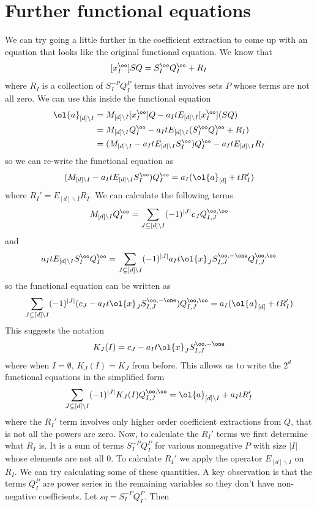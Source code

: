 \section{Further functional equations}
We can try going a little further in the coefficient extraction to come up with an equation that looks like the original functional equation. We know that
\[
	[x_I^\oo] SQ  = S_I^\oo Q_I^\oo + R_I
\]
where $R_I$ is a collection of $S_I^{-P} Q_I^{P}$ terms that involves sets $P$ whose terms are not all zero. We can use this inside the functional equation
\begin{align*}
	\ol{a}_{[d]\backslash I} &= M_{[d]\backslash I}[x_I^\oo]Q- a_{I}t E_{[d]\backslash I}[x_I^\oo](SQ)\\
	& = M_{[d]\backslash I}Q_I^\oo- a_{I}t E_{[d]\backslash I}(S_I^\oo Q_I^\oo + R_I)\\
	& = (M_{[d]\backslash I} - a_{I}t E_{[d]\backslash I}S_I^\oo)Q_I^\oo  -a_{I}t E_{[d]\backslash I}R_I
\end{align*}
so we can re-write the functional equation as
\[
	(M_{[d]\backslash I} - a_{I}t E_{[d]\backslash I}S_I^\oo)Q_I^\oo = a_I(\ol{a}_{[d]}+t R_I')
\]
where $R_I' =  E_{[d]\backslash I}R_I$. We can calculate the following terms
\[
	M_{[d]\backslash I}Q_I^\oo = \sum_{J \subseteq [d]\backslash I} (-1)^{|J|}c_J Q_{I,J}^{\oo,\oo}
\]
and
\[
	a_I t E_{[d]\backslash I}S_I^\oo Q_I^\oo = \sum_{J \subseteq [d]\backslash I}  (-1)^{|J|}a_I t\ol{x}_J S_{I,J}^{\oo,-\one}Q_{I,J}^{\oo,\oo}
\]
so the functional equation can be written as
\[
	\sum_{J \subseteq [d]\backslash I}  (-1)^{|J|}(c_J - a_I t\ol{x}_J S_{I,J}^{\oo,-\one})Q_{I,J}^{\oo,\oo} = a_I(\ol{a}_{[d]}+t R_I')
\]
This suggests the notation
\[
	K_J(I) = c_J - a_I t\ol{x}_J S_{I,J}^{\oo,-\one}
\]
where when $I = \emptyset$, $K_J(I) = K_J$ from before. This allows us to write the $2^d$ functional equations in the simplified form
\[
	\sum_{J \subseteq [d]\backslash I}  (-1)^{|J|}K_J (I) Q_{I,J}^{\oo,\oo} = \ol{a}_{[d]\backslash I}+a_I t  R_I'
\]
where the $R_I'$ term involves only higher order coefficient extractions from $Q$, that is not all the powers are zero. Now, to calculate the $R_I'$ terms we first determine what $R_I$ is. It is a sum of terms $S_I^{-P} Q_I^{P}$ for various nonnegative $P$ with size $|I|$ whose elements are not all 0. To calculate $R_I'$ we apply the operator $E_{[d]\backslash I}$ on $R_I$. We can try calculating some of these quantities. A key observation is that the terms $Q_I^P$ are power series in the remaining variables so they don't have non-negative coefficients. Let $sq = S_I^{-P} Q_I^{P}$. Then
